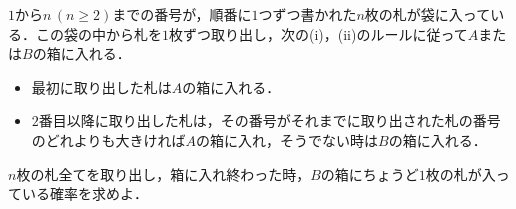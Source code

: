 \documentclass[../../main.tex]{subfiles}
\begin{document}
$1$から$n\, (n\ge 2)$までの番号が，順番に$1$つずつ書かれた$n$枚の札が袋に入っている．この袋の中から札を$1$枚ずつ取り出し，次の(i)，(ii)のルールに従って$A$または$B$の箱に入れる．
\begin{itemize}
  \item[(i)] 最初に取り出した札は$A$の箱に入れる．
  \item[(ii)] $2$番目以降に取り出した札は，その番号がそれまでに取り出された札の番号のどれよりも大きければ$A$の箱に入れ，そうでない時は$B$の箱に入れる．
\end{itemize}

$n$枚の札全てを取り出し，箱に入れ終わった時，$B$の箱にちょうど$1$枚の札が入っている確率を求めよ．
\end{document}
